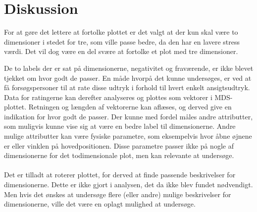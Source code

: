 \section*{Diskussion}
\label{Diskussion}
%
For at gøre det lettere at fortolke plottet er det valgt at der kun skal være to dimensioner i stedet for tre, som ville passe bedre, da den har en lavere stress værdi. Det vil dog være en del svære at fortolke et plot med tre dimensioner. 

De to labels der er sat på dimensionerne, negativitet og fraværende, er ikke blevet tjekket om hvor godt de passer. En måde hvorpå det kunne undersøges, er ved at få forsøgspersoner til at rate disse udtryk i forhold til hvert enkelt ansigtsudtryk. Data for ratingerne kan derefter analyseres og plottes som vektorer i MDS-plottet. Retningen og længden af vektorerne kan aflæses, og derved give en indikation for hvor godt de passer. Der kunne med fordel måles andre attributter, som muligvis kunne vise sig at være en bedre label til dimensionerne. 
Andre mulige attributter kan være fysiske parametre, som eksempelvis hvor åbne øjnene er eller vinklen på hovedpositionen. Disse parametre passer ikke på nogle af dimensionerne for det todimensionale plot, men kan relevante at undersøge. 
\\\\
Det er tilladt at roterer plottet, for derved at finde passende beskrivelser for dimensionerne. Dette er ikke gjort i analysen, det da ikke blev fundet nødvendigt. Men hvis det ønskes at undersøge flere (eller andre) mulige beskrivelser for dimensionerne, ville det være en oplagt mulighed at undersøge. 